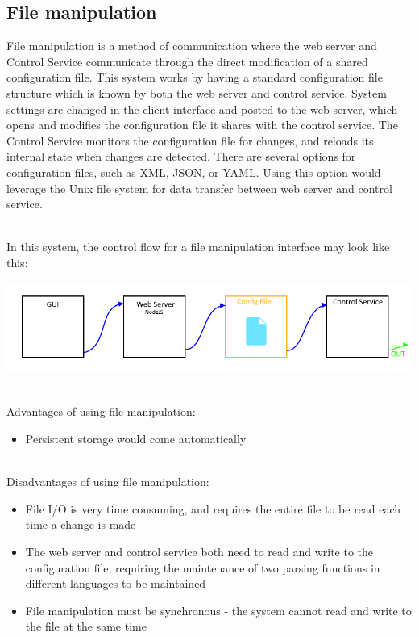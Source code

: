 \documentclass[onecolumn, draftclsnofoot,10pt, compsoc]{IEEEtran}
\begin{document}

		\subsection{File manipulation}
		File manipulation is a method of communication where the web server and Control Service communicate through the direct modification of a shared configuration file.
		This system works by having a standard configuration file structure which is known by both the web server and control service.
		System settings are changed in the client interface and posted to the web server, which opens and modifies the configuration file it shares with the control service.
		The Control Service monitors the configuration file for changes, and reloads its internal state when changes are detected.
		There are several options for configuration files, such as XML, JSON, or YAML. \cite{config1}
		Using this option would leverage the Unix file system for data transfer between web server and control service.

		\noindent \\In this system, the control flow for a file manipulation interface may look like this:

		\includegraphics[width=\linewidth]{FileManipDiag.png}

		\noindent \\Advantages of using file manipulation:
		\begin{itemize}
			\item Persistent storage would come automatically
		\end{itemize}

		\noindent \\Disadvantages of using file manipulation:
		\begin{itemize}
			\item File I/O is very time consuming, and requires the entire file to be read each time a change is made
			\item The web server and control service both need to read and write to the configuration file, requiring the maintenance of two parsing functions in different languages to be maintained
			\item File manipulation must be synchronous - the system cannot read and write to the file at the same time
		\end{itemize}
\end{document}
